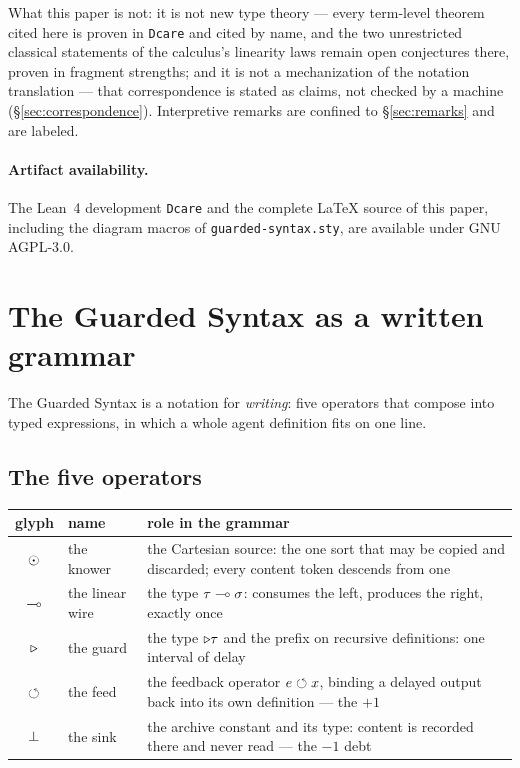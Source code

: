 \documentclass{eptcs}
\begin{document}
What this paper is not: it is not new type theory --- every term-level
theorem cited here is proven in \texttt{Dcare} and cited by name, and the
two unrestricted classical statements of the calculus's linearity laws
remain open conjectures there, proven in fragment strengths; and it is not
a mechanization of the notation translation --- that correspondence is
stated as claims, not checked by a machine (\S\ref{sec:correspondence}).
Interpretive remarks are confined to \S\ref{sec:remarks} and are labeled.

\paragraph{Artifact availability.}
The Lean~4 development \texttt{Dcare} and the complete \LaTeX{} source of
this paper, including the diagram macros of \texttt{guarded-syntax.sty},
are available under GNU AGPL-3.0.

\section{The Guarded Syntax as a written grammar}\label{sec:core}

The Guarded Syntax is a notation for \emph{writing}: five operators
that compose into typed expressions, in which a whole agent definition
fits on one line.

\subsection{The five operators}\label{sec:core:ops}

\begin{center}
\begin{tabular}{clp{60mm}}
\textbf{glyph} & \textbf{name} & \textbf{role in the grammar}\\
\hline
$\odot$ & the knower & the Cartesian source: the one sort that may be
copied and discarded; every content token descends from one\\
$\multimap$ & the linear wire & the type $\tau \multimap \sigma$: consumes the
left, produces the right, exactly once\\
$\triangleright$ & the guard & the type $\triangleright\tau$ and the prefix on recursive
definitions: one interval of delay\\
$\circlearrowleft$ & the feed & the feedback operator $e \circlearrowleft x$, binding a
delayed output back into its own definition --- the $+1$\\
$\bot$ & the sink & the archive constant and its type: content is
recorded there and never read --- the $-1$ debt\\
\end{tabular}
\end{center}
\end{document}
